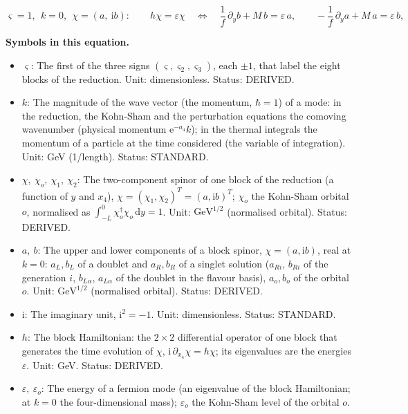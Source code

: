 \documentclass[
  10pt,
]{article}
\providecommand{\tightlist}{%
  \setlength{\itemsep}{0pt}\setlength{\parskip}{0pt}}
\begin{document}
\[
\varsigma = 1,\ \ k = 0,\ \ \chi = (a,\ \mathrm{i}b):\qquad h\chi = \varepsilon\chi\quad\Leftrightarrow\quad
\frac{1}{f}\,\partial_yb + M\,b = \varepsilon\,a,\qquad -\frac{1}{f}\,\partial_ya + M\,a = \varepsilon\,b,
\]

\textbf{Symbols in this equation.}

\begin{itemize}
\tightlist
\item
  \(\varsigma\): The first of the three signs
  \((\varsigma, \varsigma_2, \varsigma_3)\), each \(\pm1\), that label
  the eight blocks of the reduction. Unit: dimensionless. Status:
  DERIVED.
\item
  \(k\): The magnitude of the wave vector (the momentum, \(\hbar = 1\))
  of a mode: in the reduction, the Kohn-Sham and the perturbation
  equations the comoving wavenumber (physical momentum
  \(\mathrm{e}^{-a_4}k\)); in the thermal integrals the momentum of a
  particle at the time considered (the variable of integration). Unit:
  GeV (1/length). Status: STANDARD.
\item
  \(\chi,\ \chi_o,\ \chi_1,\ \chi_2\): The two-component spinor of one
  block of the reduction (a function of \(y\) and \(x_4\)),
  \(\chi = (\chi_1, \chi_2)^T = (a, \mathrm{i}b)^T\); \(\chi_o\) the
  Kohn-Sham orbital \(o\), normalised as
  \(\int_{-L}^{0}\chi_o^\dagger\chi_o\,\mathrm{d}y = 1\). Unit:
  \(\mathrm{GeV}^{1/2}\) (normalised orbital). Status: DERIVED.
\item
  \(a,\ b\): The upper and lower components of a block spinor,
  \(\chi = (a, \mathrm{i}b)\), real at \(k = 0\): \(a_L, b_L\) of a
  doublet and \(a_R, b_R\) of a singlet solution (\(a_{Ri}\), \(b_{Ri}\)
  of the generation \(i\), \(b_{L\alpha}\), \(a_{L\alpha}\) of the
  doublet in the flavour basis), \(a_o, b_o\) of the orbital \(o\).
  Unit: \(\mathrm{GeV}^{1/2}\) (normalised orbital). Status: DERIVED.
\item
  \(\mathrm{i}\): The imaginary unit, \(\mathrm{i}^2 = -1\). Unit:
  dimensionless. Status: STANDARD.
\item
  \(h\): The block Hamiltonian: the \(2 \times 2\) differential operator
  of one block that generates the time evolution of \(\chi\),
  \(\mathrm{i}\,\partial_{x_4}\chi = h\chi\); its eigenvalues are the
  energies \(\varepsilon\). Unit: GeV. Status: DERIVED.
\item
  \(\varepsilon,\ \varepsilon_o\): The energy of a fermion mode (an
  eigenvalue of the block Hamiltonian; at \(k = 0\) the four-dimensional
  mass); \(\varepsilon_o\) the Kohn-Sham level of the orbital \(o\).

\end{itemize}
\end{document}
